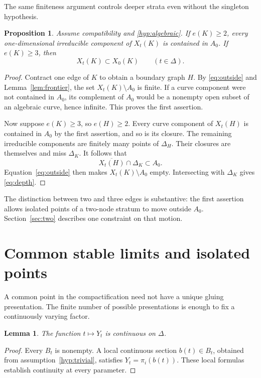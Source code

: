 \documentclass[11pt]{article}
\newcommand{\cl}[1]{\overline{#1}}
\newtheorem{proposition}[theorem]{Proposition}
\newtheorem{lemma}[theorem]{Lemma}
\theoremstyle{definition}
\theoremstyle{remark}
\begin{document}
The same finiteness argument controls deeper strata even without the singleton hypothesis.

\begin{proposition}\label{prop:depth}
Assume compatibility and \eqref{hyp:algebraic}. If $e(K)\geq2$, every one-dimensional irreducible component of $X_t(K)$ is contained in $A_0$. If $e(K)\geq3$, then
\begin{equation}\label{eq:depth}
 X_t(K)\subset X_0(K)\qquad(t\in\Delta).
\end{equation}
\end{proposition}

\begin{proof}
Contract one edge of $K$ to obtain a boundary graph $H$. By \eqref{eq:outside} and Lemma~\ref{lem:frontier}, the set $X_t(K)\setminus A_0$ is finite. If a curve component were not contained in $A_0$, its complement of $A_0$ would be a nonempty open subset of an algebraic curve, hence infinite. This proves the first assertion.

Now suppose $e(K)\geq3$, so $e(H)\geq2$. Every curve component of $X_t(H)$ is contained in $A_0$ by the first assertion, and so is its closure. The remaining irreducible components are finitely many points of $\Delta_H$. Their closures are themselves and miss $\Delta_K$. It follows that
\[
 \cl{X_t(H)}\cap\Delta_K\subset A_0.
\]
Equation~\eqref{eq:outside} then makes $X_t(K)\setminus A_0$ empty. Intersecting with $\Delta_K$ gives \eqref{eq:depth}.
\end{proof}

The distinction between two and three edges is substantive: the first assertion allows isolated points of a two-node stratum to move outside $A_0$. Section~\ref{sec:two} describes one constraint on that motion.

\section{Common stable limits and isolated points}\label{sec:common}

A common point in the compactification need not have a unique gluing presentation. The finite number of possible presentations is enough to fix a continuously varying factor.

\begin{lemma}\label{lem:continuous}
The function $t\mapsto Y_t$ is continuous on $\Delta$.
\end{lemma}

\begin{proof}
Every $B_t$ is nonempty. A local continuous section $b(t)\in B_t$, obtained from assumption~\ref{hyp:trivial}, satisfies $Y_t=\pi_i(b(t))$. These local formulas establish continuity at every parameter.
\end{proof}
\end{document}

